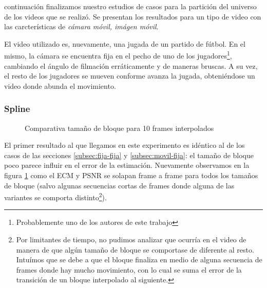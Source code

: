  continuaci\'on finalizamos nuestro estudios de casos para
la partici\'on del universo de los videos que se realiz\'o. Se presentan los
resultados para un tipo de video con las carcter\'isticas de \emph{c\'amara
m\'ovil, im\'agen m\'ovil}.

\par El video utilizado es, nuevamente, una jugada de un partido de f\'utbol.
En el mismo, la c\'amara se encuentra fija en el pecho de uno de los
jugadores\footnote{Probablemente uno de los autores de este trabajo},
cambiando el \'angulo de filmaci\'on err\'aticamente y de maneras bruscas. A su
vez, el resto de los jugadores se mueven conforme avanza la jugada,
obteni\'endose un video donde abunda el movimiento.

\subsubsection{Spline}

\begin{figure}[H]
    \centering
    \caption{Comparativa tama\~no de bloque para 10 frames interpolados}
    \label{fig:movil-movil_spline-bloques}
\end{figure}

\par El primer resultado al que llegamos en este experimento es id\'entico al
de los casos de las secciones \ref{subsec:fija-fija} y \ref{subsec:movil-fija}:
el tama\~no de bloque poco parece influir en el error de la estimaci\'on.
Nuevamente observamos en la figura \ref{fig:movil-movil_spline-bloques} como
el ECM y PSNR se solapan frame a frame para todos los tama\~nos de bloque
(salvo algunas secuencias cortas de frames donde alguna de las variantes se
comporta distinto\footnote{Por limitantes de tiempo, no pudimos analizar que
ocurr\'ia en el video de manera de que alg\'un tama\~no de bloque se comportase
de diferente al resto. Intu\'imos que se debe a que el bloque finaliza en medio
de alguna secuencia de frames donde hay mucho movimiento, con lo cual se suma
el error de la transici\'on de un bloque interpolado al siguiente.}).

